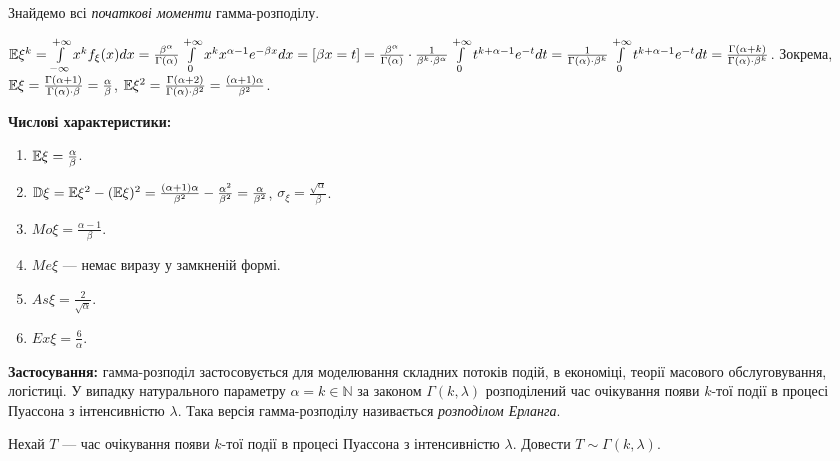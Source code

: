 Знайдемо всі \emph{початкові моменти} гамма-розподілу.

$\mathbb{E}\xi^k = \int\limits_{-\infty}^{+\infty} x^k f_\xi(x)dx = \frac{\beta^\alpha}{\Gamma(\alpha)} \int\limits_0^{+\infty} x^k x^{\alpha-1} e^{-\beta x} dx = 
\left[ \beta x = t\right] = \frac{\beta^\alpha}{\Gamma(\alpha)} \cdot \frac{1}{\beta^k\cdot \beta^{\alpha}} \int\limits_0^{+\infty} t^{k+\alpha-1} e^{-t} dt = 
\frac{1}{\Gamma(\alpha) \cdot \beta^k} \int\limits_0^{+\infty} t^{k+\alpha-1} e^{-t} dt = \frac{\Gamma(\alpha+k)}{\Gamma(\alpha) \cdot \beta^k}$.
Зокрема, $\mathbb{E}\xi = \frac{\Gamma(\alpha+1)}{\Gamma(\alpha) \cdot \beta} = \frac{\alpha}{\beta}$,
$\mathbb{E}\xi^2 = \frac{\Gamma(\alpha+2)}{\Gamma(\alpha) \cdot \beta^2}  = \frac{(\alpha+1)\alpha}{\beta^2}$.

\noindent\textbf{Числові характеристики:}
\begin{enumerate}
    \item $\mathbb{E}\xi = \frac{\alpha}{\beta}$.
    \item $\mathbb{D}\xi = \mathbb{E}\xi^2 - (\mathbb{E}\xi)^2 = \frac{(\alpha+1)\alpha}{\beta^2} - \frac{\alpha^2}{\beta^2} = \frac{\alpha}{\beta^2}$, $\sigma_\xi = \frac{\sqrt{\alpha}}{\beta}$.
    \item ${Mo}\xi = \frac{\alpha-1}{\beta}$.
    \item ${Me}\xi$ --- немає виразу у замкненій формі.
    \item ${As}\xi = \frac{2}{\sqrt{\alpha}}$.
    \item ${Ex}\xi = \frac{6}{\alpha}$.
\end{enumerate}

\noindent\textbf{Застосування:} гамма-розподіл застосовується для моделювання
складних потоків подій, в економіці, теорії масового обслуговування, логістиці.
У випадку натурального параметру $\alpha = k \in \mathbb{N}$ за законом
$\Gamma(k, \lambda)$ розподілений час очікування появи $k$-тої події
в процесі Пуассона з інтенсивністю $\lambda$. Така версія гамма-розподілу називається \emph{розподілом Ерланга}.
\begin{exercise}
    Нехай $T$ --- час очікування появи $k$-тої події
    в процесі Пуассона з інтенсивністю $\lambda$. Довести $T \sim \Gamma(k, \lambda)$.
\end{exercise} %